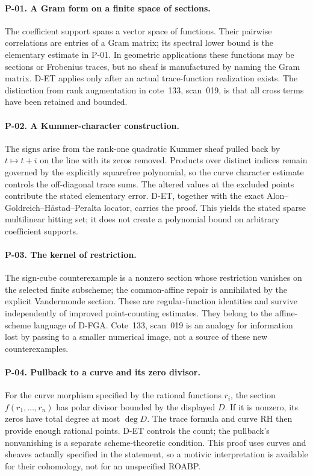 \paragraph{P-01. A Gram form on a finite space of sections.}
The coefficient support spans a vector space of functions. Their pairwise correlations are entries of a Gram matrix; its spectral lower bound is the elementary estimate in P-01. In geometric applications these functions may be sections or Frobenius traces, but no sheaf is manufactured by naming the Gram matrix. D-ET applies only after an actual trace-function realization exists. The distinction from rank augmentation in cote~133, scan~019, is that all cross terms have been retained and bounded.

\paragraph{P-02. A Kummer-character construction.}
The signs arise from the rank-one quadratic Kummer sheaf pulled back by $t\mapsto t+i$ on the line with its zeros removed. Products over distinct indices remain governed by the explicitly squarefree polynomial, so the curve character estimate controls the off-diagonal trace sums. The altered values at the excluded points contribute the stated elementary error. D-ET, together with the exact Alon--Goldreich--H\aa stad--Peralta locator, carries the proof. This yields the stated sparse multilinear hitting set; it does not create a polynomial bound on arbitrary coefficient supports.

\paragraph{P-03. The kernel of restriction.}
The sign-cube counterexample is a nonzero section whose restriction vanishes on the selected finite subscheme; the common-affine repair is annihilated by the explicit Vandermonde section. These are regular-function identities and survive independently of improved point-counting estimates. They belong to the affine-scheme language of D-FGA. Cote~133, scan~019 is an analogy for information lost by passing to a smaller numerical image, not a source of these new counterexamples.

\paragraph{P-04. Pullback to a curve and its zero divisor.}
For the curve morphism specified by the rational functions $r_i$, the section $f(r_1,\ldots,r_n)$ has polar divisor bounded by the displayed $D$. If it is nonzero, its zeros have total degree at most $\deg D$. The trace formula and curve RH then provide enough rational points. D-ET controls the count; the pullback's nonvanishing is a separate scheme-theoretic condition. This proof uses curves and sheaves actually specified in the statement, so a motivic interpretation is available for their cohomology, not for an unspecified ROABP.

